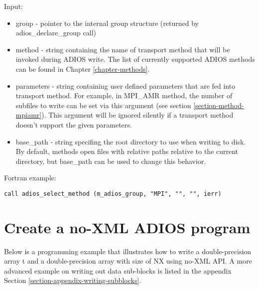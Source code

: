 Input:
\begin{itemize}
\item group - pointer to the internal group structure (returned by adios\_declare\_group 
call)

\item method - string containing the name of transport method that will be invoked during 
ADIOS write. The list of currently supported ADIOS methods can be found in Chapter 
\ref{chapter-methods}.

\item parameters - string containing user defined parameters that are fed into transport 
method.  For example, in MPI\_AMR method, the number of subfiles to write can be 
set via this argument (see section \ref{section-method-mpiamr}).
This argument will be ignored silently if a transport method doesn't support 
the given parameters.

\item base\_path -  string specifing the root directory to use when writing to disk. 
By default, methods open files with relative paths relative to the current directory, 
but base\_path can be used to change this behavior.
\end{itemize}

Fortran example: 
\begin{lstlisting}[alsolanguage=Fortran,caption={},label={}]
call adios_select_method (m_adios_group, "MPI", "", "", ierr)
\end{lstlisting}

\section{Create a no-XML ADIOS program}

Below is a programming example that illustrates how to write a double-precision 
array t and a double-precision array with size of NX using no-XML API.
A more advanced example on writing out data sub-blocks is listed in the 
appendix Section \ref{section-appendix-writing-subblocks}. 

